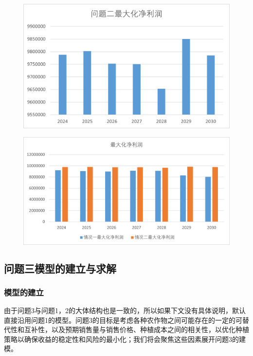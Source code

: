 \documentclass[withoutpreface]{cumcmthesis}
\begin{document}
\begin{figure}[H]
    \centering
    \begin{minipage}{0.49\textwidth}  %
        \centering
        \includegraphics[width=0.9\linewidth]{4.png}  %
        \label{fig:profit_case2}
    \end{minipage}\hfill  %
    \begin{minipage}{0.49\textwidth}  %
        \centering
        \includegraphics[width=0.9\linewidth]{5.png}  %
        \label{fig:profit_case2_1_1}
    \end{minipage}
    \caption{}
\end{figure}


\subsection{问题三模型的建立与求解}
\subsubsection{模型的建立}
由于问题3与问题1，2的大体结构也是一致的，所以如果下文没有具体说明，默认直接沿用问题1的模型。问题3的目标是考虑各种农作物之间可能存在的一定的可替代性和互补性，以及预期销售量与销售价格、种植成本之间的相关性，以优化种植策略以确保收益的稳定性和风险的最小化；我们将会聚焦这些因素展开问题3的建模。
\end{document}
